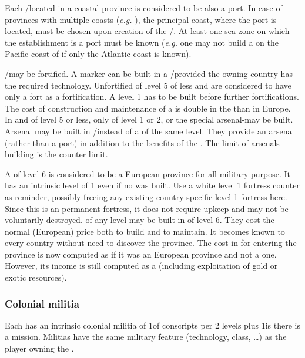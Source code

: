  Each \COL/\TP located in a coastal province
is considered to be also a port.
\bparag In case of provinces with multiple coasts (\emph{e.g.}
), the principal coast, where the port is located, must
be chosen upon creation of the \COL/\TP. At least one sea zone on which the
establishment is a port must be known (\emph{e.g.} one may not build a \COL on
the Pacific coast of \granderegionPanama if only the Atlantic coast is known).

\aparag[Fortifications] \COL/\TP may be fortified. A \fortress marker can be
built in a \COL/\TP provided the owning country has the required technology.
\bparag Unfortified \COL of level 5 of less and \TP are considered to have
only a fort as a fortification. A level 1 \fortress has to be built before
further fortifications.
\bparag The cost of construction and maintenance of a \fortress is double in
the \ROTW than in Europe.
\bparag In \TP and \COL of level 5 or less, only \fortress of level 1 or 2, or
the special arsenal-\fortress may be built.
\bparag Arsenal may be built in \COL/\TP instead of a \fortress of the same
level. They provide an arsenal (rather than a port) in addition to the
benefits of the \fortress. The limit of arsenals building is the counter
limit.

 A \COL of level 6 is considered to be a European
province for all military purpose.
\bparag It has an intrinsic \fortress level of 1 even if no \fortress was
built. Use a white level 1 fortress counter as reminder, possibly freeing any
existing country-specific level 1 fortress here. Since this is an permanent
fortress, it does not require upkeep and may not be voluntarily destroyed.
\bparag \fortress of any level may be built in \COL of level 6. They cost the
normal (European) price both to build and to maintain.
\bparag It becomes known to every country without need to discover the
province.
\bparag The cost in \MP for entering the province is now computed as if it was
an European province and not a \ROTW one.
\bparag However, its income is still computed as a \COL (including
exploitation of gold or exotic resources).


\subsubsection{Colonial militia}
\aparag Each \COL has an intrinsic colonial militia of 1\LDE of conscripts per
2 levels plus 1\LDE is there is a mission.
\bparag Militias have the same military feature (technology, class, \ldots) as
the player owning the \COL.

